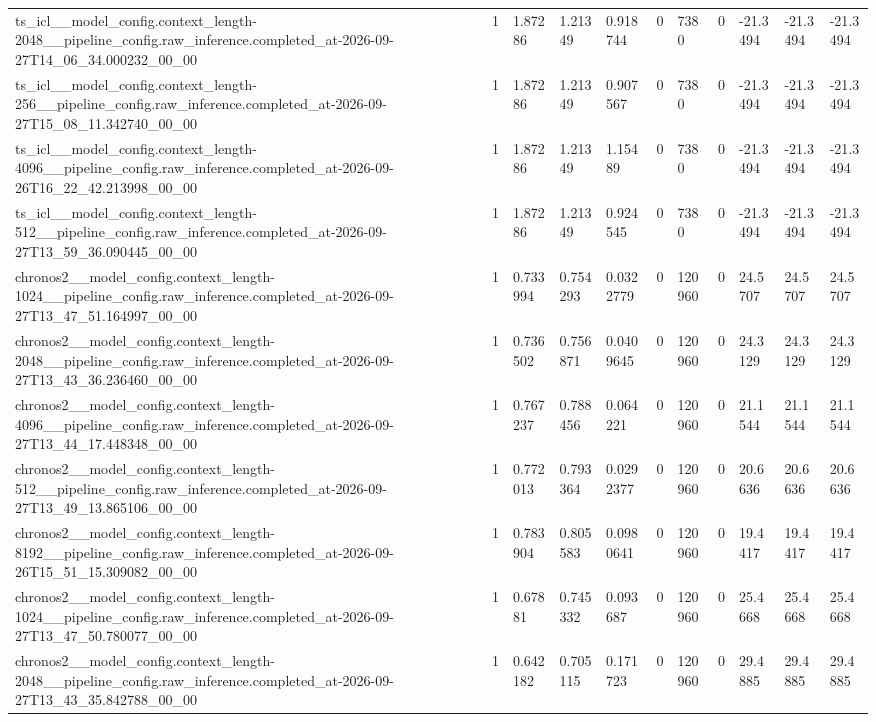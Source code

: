 \begin{tabular}{lllllllllll}
ts\_icl\_\_model\_config.context\_length-2048\_\_pipeline\_config.raw\_inference.completed\_at-2026-09-27T14\_06\_34.000232\_00\_00 & 1 & 1.87286 & 1.21349 & 0.918744 & 0 & 7380 & 0 & -21.3494 & -21.3494 & -21.3494 \\
ts\_icl\_\_model\_config.context\_length-256\_\_pipeline\_config.raw\_inference.completed\_at-2026-09-27T15\_08\_11.342740\_00\_00 & 1 & 1.87286 & 1.21349 & 0.907567 & 0 & 7380 & 0 & -21.3494 & -21.3494 & -21.3494 \\
ts\_icl\_\_model\_config.context\_length-4096\_\_pipeline\_config.raw\_inference.completed\_at-2026-09-26T16\_22\_42.213998\_00\_00 & 1 & 1.87286 & 1.21349 & 1.15489 & 0 & 7380 & 0 & -21.3494 & -21.3494 & -21.3494 \\
ts\_icl\_\_model\_config.context\_length-512\_\_pipeline\_config.raw\_inference.completed\_at-2026-09-27T13\_59\_36.090445\_00\_00 & 1 & 1.87286 & 1.21349 & 0.924545 & 0 & 7380 & 0 & -21.3494 & -21.3494 & -21.3494 \\
chronos2\_\_model\_config.context\_length-1024\_\_pipeline\_config.raw\_inference.completed\_at-2026-09-27T13\_47\_51.164997\_00\_00 & 1 & 0.733994 & 0.754293 & 0.0322779 & 0 & 120960 & 0 & 24.5707 & 24.5707 & 24.5707 \\
chronos2\_\_model\_config.context\_length-2048\_\_pipeline\_config.raw\_inference.completed\_at-2026-09-27T13\_43\_36.236460\_00\_00 & 1 & 0.736502 & 0.756871 & 0.0409645 & 0 & 120960 & 0 & 24.3129 & 24.3129 & 24.3129 \\
chronos2\_\_model\_config.context\_length-4096\_\_pipeline\_config.raw\_inference.completed\_at-2026-09-27T13\_44\_17.448348\_00\_00 & 1 & 0.767237 & 0.788456 & 0.064221 & 0 & 120960 & 0 & 21.1544 & 21.1544 & 21.1544 \\
chronos2\_\_model\_config.context\_length-512\_\_pipeline\_config.raw\_inference.completed\_at-2026-09-27T13\_49\_13.865106\_00\_00 & 1 & 0.772013 & 0.793364 & 0.0292377 & 0 & 120960 & 0 & 20.6636 & 20.6636 & 20.6636 \\
chronos2\_\_model\_config.context\_length-8192\_\_pipeline\_config.raw\_inference.completed\_at-2026-09-26T15\_51\_15.309082\_00\_00 & 1 & 0.783904 & 0.805583 & 0.0980641 & 0 & 120960 & 0 & 19.4417 & 19.4417 & 19.4417 \\
chronos2\_\_model\_config.context\_length-1024\_\_pipeline\_config.raw\_inference.completed\_at-2026-09-27T13\_47\_50.780077\_00\_00 & 1 & 0.67881 & 0.745332 & 0.093687 & 0 & 120960 & 0 & 25.4668 & 25.4668 & 25.4668 \\
chronos2\_\_model\_config.context\_length-2048\_\_pipeline\_config.raw\_inference.completed\_at-2026-09-27T13\_43\_35.842788\_00\_00 & 1 & 0.642182 & 0.705115 & 0.171723 & 0 & 120960 & 0 & 29.4885 & 29.4885 & 29.4885 \\

\end{tabular}
